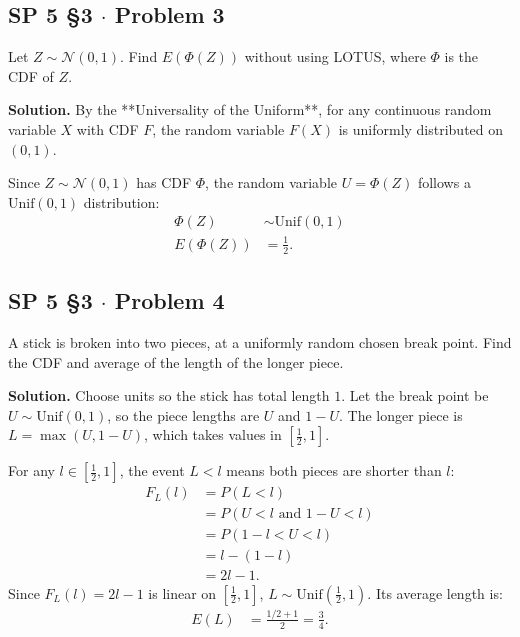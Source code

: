 \documentclass[11pt,a4paper]{article}
\begin{document}
\vspace{10pt}
\subsection{SP 5 \S3 $\cdot$ Problem 3}
\begin{tcolorbox}[title={SP 5 \S3 $\cdot$ Problem 3}]
Let $Z \sim \mathcal{N}(0, 1)$. Find $E(\Phi(Z))$ without using LOTUS, where $\Phi$ is the CDF of $Z$.
\end{tcolorbox}

\noindent \textbf{Solution.} By the **Universality of the Uniform**, for any continuous random variable $X$ with CDF $F$, the random variable $F(X)$ is uniformly distributed on $(0, 1)$. 

Since $Z \sim \mathcal{N}(0, 1)$ has CDF $\Phi$, the random variable $U = \Phi(Z)$ follows a $\text{Unif}(0, 1)$ distribution:
\begin{align*}
\Phi(Z) &\sim \text{Unif}(0, 1) \\
E(\Phi(Z)) &= \frac{1}{2}.
\end{align*}

\vspace{10pt}
\subsection{SP 5 \S3 $\cdot$ Problem 4}
\begin{tcolorbox}[title={SP 5 \S3 $\cdot$ Problem 4}]
A stick is broken into two pieces, at a uniformly random chosen break point. Find the CDF and average of the length of the longer piece.
\end{tcolorbox}

\noindent \textbf{Solution.} Choose units so the stick has total length $1$. Let the break point be $U \sim \text{Unif}(0, 1)$, so the piece lengths are $U$ and $1 - U$. The longer piece is $L = \max(U, 1 - U)$, which takes values in $\left[\frac{1}{2}, 1\right]$.

For any $l \in \left[\frac{1}{2}, 1\right]$, the event $L < l$ means both pieces are shorter than $l$:
\begin{align*}
F_L(l) &= P(L < l) \\
&= P(U < l \text{ and } 1 - U < l) \\
&= P(1 - l < U < l) \\
&= l - (1 - l) \\
&= 2l - 1.
\end{align*}
Since $F_L(l) = 2l - 1$ is linear on $\left[\frac{1}{2}, 1\right]$, $L \sim \text{Unif}\left(\frac{1}{2}, 1\right)$. Its average length is:
\begin{align*}
E(L) &= \frac{1/2 + 1}{2} = \frac{3}{4}.
\end{align*}
\end{document}
